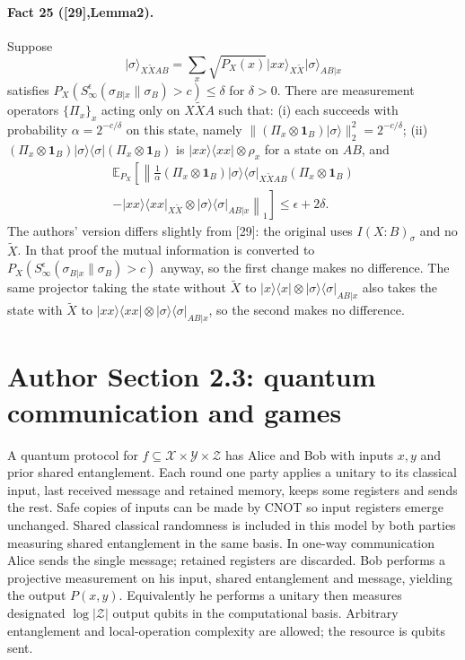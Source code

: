 \documentclass[10pt,a4paper]{article}
\providecommand{\ket}[1]{\lvert#1\rangle}
\providecommand{\bra}[1]{\langle#1\rvert}
\providecommand{\proj}[1]{\ket{#1}\bra{#1}}
\providecommand{\Id}[1]{\mathbf1_{#1}}
\begin{document}
\paragraph{Fact 25 ([29],Lemma2).} Suppose
\[\ket\sigma_{X\widetilde XAB}=\sum_x\sqrt{P_X(x)}\ket{xx}_{X\widetilde X}\ket\sigma_{AB|x}\]
satisfies $P_X(S_\infty^\epsilon(\sigma_{B|x}\|\sigma_B)>c)\le\delta$ for $\delta>0$. There are measurement operators $\{\Pi_x\}_x$ acting only on $X\widetilde XA$ such that: (i) each succeeds with probability $\alpha=2^{-c/\delta}$ on this state, namely $\|(\Pi_x\otimes\Id B)\ket\sigma\|_2^2=2^{-c/\delta}$; (ii) $(\Pi_x\otimes\Id B)\proj\sigma(\Pi_x\otimes\Id B)$ is $\proj{xx}\otimes\rho_x$ for a state on $AB$, and
\begin{multline*}\mathbb E_{P_X}\left[\left\|\frac1\alpha(\Pi_x\otimes\Id B)\proj\sigma_{X\widetilde XAB}(\Pi_x\otimes\Id B)\right.\right.\\\left.\left.-\proj{xx}_{X\widetilde X}\otimes\proj\sigma_{AB|x}\right\|_1\right]\le\epsilon+2\delta.\end{multline*}
The authors' version differs slightly from [29]: the original uses $I(X:B)_\sigma$ and no $\widetilde X$. In that proof the mutual information is converted to $P_X(S_\infty^\epsilon(\sigma_{B|x}\|\sigma_B)>c)$ anyway, so the first change makes no difference. The same projector taking the state without $\widetilde X$ to $\proj x\otimes\proj\sigma_{AB|x}$ also takes the state with $\widetilde X$ to $\proj{xx}\otimes\proj\sigma_{AB|x}$, so the second makes no difference.

\section*{Author Section 2.3: quantum communication and games}
A quantum protocol for $f\subseteq\mathcal X\times\mathcal Y\times\mathcal Z$ has Alice and Bob with inputs $x,y$ and prior shared entanglement. Each round one party applies a unitary to its classical input, last received message and retained memory, keeps some registers and sends the rest. Safe copies of inputs can be made by CNOT so input registers emerge unchanged. Shared classical randomness is included in this model by both parties measuring shared entanglement in the same basis. In one-way communication Alice sends the single message; retained registers are discarded. Bob performs a projective measurement on his input, shared entanglement and message, yielding the output $P(x,y)$. Equivalently he performs a unitary then measures designated $\log|\mathcal Z|$ output qubits in the computational basis. Arbitrary entanglement and local-operation complexity are allowed; the resource is qubits sent.
\end{document}
